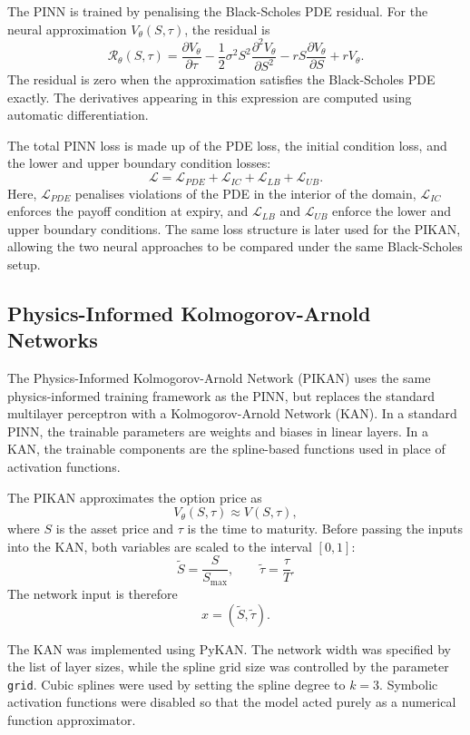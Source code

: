 \documentclass[11pt,a4paper]{article}
\begin{document}
The PINN is trained by penalising the Black-Scholes PDE residual. For the neural approximation $V_\theta(S,\tau)$, the residual is
\[
\mathcal{R}_\theta(S,\tau)
=
\frac{\partial V_\theta}{\partial \tau}
-
\frac{1}{2}\sigma^2S^2
\frac{\partial^2 V_\theta}{\partial S^2}
-
rS\frac{\partial V_\theta}{\partial S}
+
rV_\theta.
\]
The residual is zero when the approximation satisfies the Black-Scholes PDE exactly. The derivatives appearing in this expression are computed using automatic differentiation.

The total PINN loss is made up of the PDE loss, the initial condition loss, and the lower and upper boundary condition losses:
\[
\mathcal{L}
=
\mathcal{L}_{PDE}
+
\mathcal{L}_{IC}
+
\mathcal{L}_{LB}
+
\mathcal{L}_{UB}.
\]
Here, $\mathcal{L}_{PDE}$ penalises violations of the PDE in the interior of the domain, $\mathcal{L}_{IC}$ enforces the payoff condition at expiry, and $\mathcal{L}_{LB}$ and $\mathcal{L}_{UB}$ enforce the lower and upper boundary conditions. The same loss structure is later used for the PIKAN, allowing the two neural approaches to be compared under the same Black-Scholes setup.

\subsection{Physics-Informed Kolmogorov-Arnold Networks}

The Physics-Informed Kolmogorov-Arnold Network (PIKAN) uses the same physics-informed training framework as the PINN, but replaces the standard multilayer perceptron with a Kolmogorov-Arnold Network (KAN). In a standard PINN, the trainable parameters are weights and biases in linear layers. In a KAN, the trainable components are the spline-based functions used in place of activation functions.

The PIKAN approximates the option price as
\[
V_\theta(S,\tau) \approx V(S,\tau),
\]
where $S$ is the asset price and $\tau$ is the time to maturity. Before passing the inputs into the KAN, both variables are scaled to the interval $[0,1]$:
\[
\tilde{S} = \frac{S}{S_{\max}},
\qquad
\tilde{\tau} = \frac{\tau}{T}.
\]
The network input is therefore
\[
x = (\tilde{S}, \tilde{\tau}).
\]

The KAN was implemented using PyKAN. The network width was specified by the list of layer sizes, while the spline grid size was controlled by the parameter \texttt{grid}. Cubic splines were used by setting the spline degree to $k=3$. Symbolic activation functions were disabled so that the model acted purely as a numerical function approximator.
\end{document}
